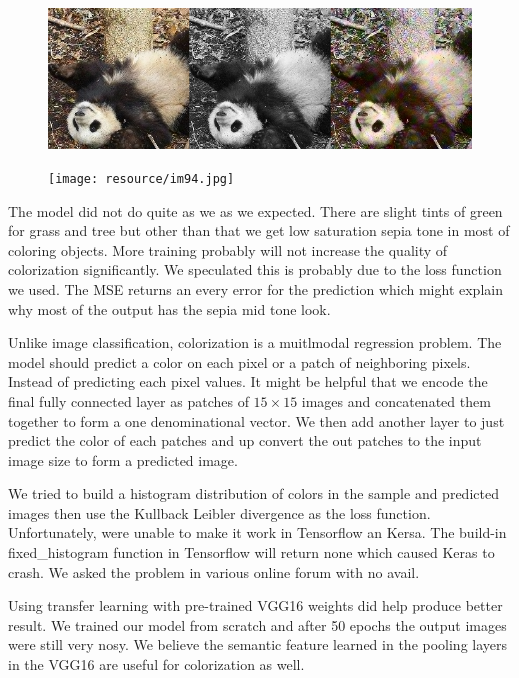 \documentclass[12pt]{article}
\begin{document}
\begin{figure}[H]
 \centering
 \includegraphics[width=5.0in]{resource/im89.jpg}
\end{figure}


\begin{figure}[H]
 \centering
 \texttt{[image: resource/im94.jpg]}
\end{figure}



The model did not do quite as we as we expected. There are slight tints of green for grass and tree but other than that we get low saturation sepia tone in most of coloring objects. More training probably will not increase the quality of colorization significantly. We speculated this is probably due to the loss function we used. The MSE returns an every error for the prediction which might explain why most of the output has the sepia mid tone look. 

Unlike image classification, colorization is a muitlmodal regression problem. The model should predict a color on each pixel or a patch of neighboring pixels. Instead of predicting each pixel values. It might be helpful that we encode the final fully connected layer as patches of $15\times15$ images and concatenated them together to form a one denominational vector. We then add another layer to just predict the color of each patches and up convert the out patches to the input image size to form a predicted image.

We tried to build a histogram distribution of colors in the sample and predicted images then use the Kullback Leibler divergence as the loss function. Unfortunately, were unable to make it work in Tensorflow an Kersa. The build-in fixed\_histogram function in Tensorflow will return none which caused Keras to crash. We asked the problem in various online forum with no avail.

Using transfer learning with pre-trained VGG16 weights did help produce better result. We trained our model from scratch and after 50 epochs the output images were still very nosy. We believe the semantic feature learned in the pooling layers in the VGG16 are useful for colorization as well. 
\end{document}
